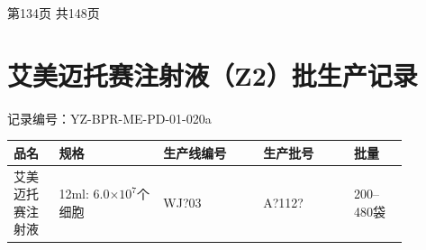 \documentclass[UTF8,10pt,a4paper,fontset=fandol]{ctexart}
\newcommand{\fieldvalue}[1]{#1}
\newcommand{\handwritten}[1]{#1}
\begin{document}
\begin{center}
第134页 共148页
\end{center}

\newpage

\section*{艾美迈托赛注射液（Z2）批生产记录}

记录编号：YZ-BPR-ME-PD-01-020a

\begin{center}
\begin{tabular}{|p{0.10\linewidth}|p{0.23\linewidth}|p{0.22\linewidth}|p{0.20\linewidth}|p{0.12\linewidth}|}
\hline
品名 & 规格 & 生产线编号 & 生产批号 & 批量 \\
\hline
艾美迈托赛注射液 &
12ml: 6.0$\times 10^{7}$个细胞 &
\fieldvalue{\handwritten{WJ?03}} &
\fieldvalue{\handwritten{A?112?}} &
200--480袋 \\
\hline
\end{tabular}
\end{center}
\end{document}
